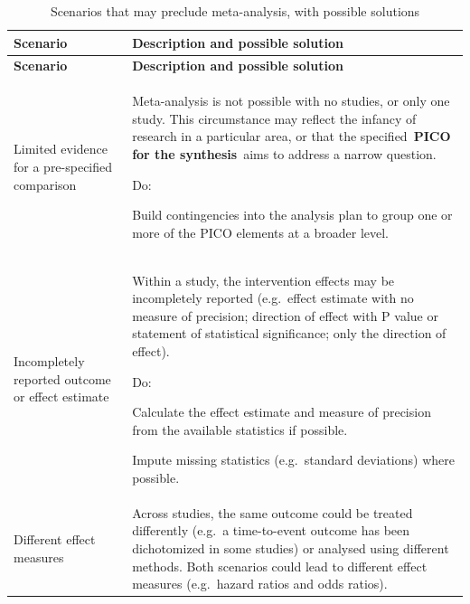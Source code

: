 \documentclass[
  10pt,
  a4paper,
  DIV=11,
  numbers=noendperiod]{scrreprt}
\begin{document}
\begin{longtable}[]{@{}
  >{\raggedright\arraybackslash}p{}
  >{\raggedright\arraybackslash}p{}@{}}
\caption{Scenarios that may preclude meta-analysis, with possible
solutions}\label{tbl-no-ma}\tabularnewline
\toprule\noalign{}
\begin{minipage}[b]{\linewidth}\raggedright
\textbf{Scenario}
\end{minipage} & \begin{minipage}[b]{\linewidth}\raggedright
\textbf{Description and possible solution}
\end{minipage} \\
\midrule\noalign{}
\endfirsthead
\toprule\noalign{}
\begin{minipage}[b]{\linewidth}\raggedright
\textbf{Scenario}
\end{minipage} & \begin{minipage}[b]{\linewidth}\raggedright
\textbf{Description and possible solution}
\end{minipage} \\
\midrule\noalign{}
\endhead
\bottomrule\noalign{}
\endlastfoot
Limited evidence for a pre-specified comparison & Meta-analysis is not
possible with no studies, or only one study. This circumstance may
reflect the infancy of research in a particular area, or that the
specified~\textbf{PICO for the synthesis}~aims to address a narrow
question.

Do:

Build contingencies into the analysis plan to group one or more of the
PICO elements at a broader level. \\
Incompletely reported outcome or effect estimate & Within a study, the
intervention effects may be incompletely reported (e.g.~effect estimate
with no measure of precision; direction of effect with P value or
statement of statistical significance; only the direction of effect).

Do:

Calculate the effect estimate and measure of precision from the
available statistics if possible.

Impute missing statistics (e.g.~standard deviations) where possible. \\
Different effect measures & Across studies, the same outcome could be
treated differently (e.g.~a time-to-event outcome has been dichotomized
in some studies) or analysed using different methods. Both scenarios
could lead to different effect measures (e.g.~hazard ratios and odds
ratios).


\end{longtable}
\end{document}
